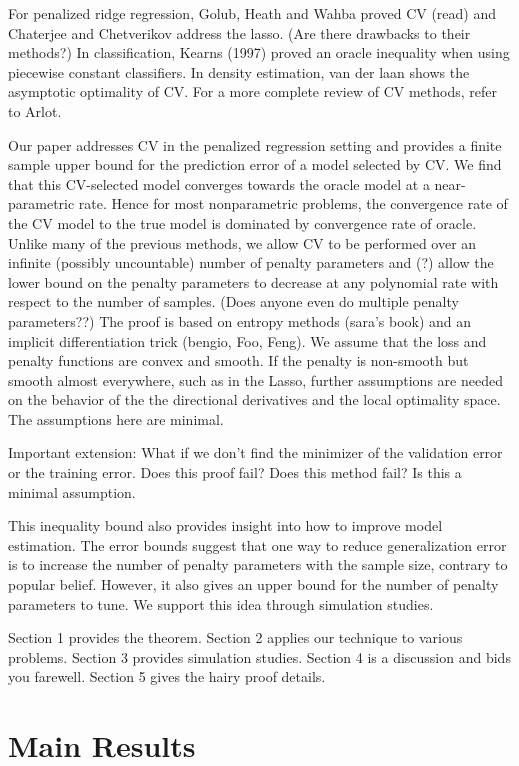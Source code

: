 \documentclass[12pt]{article}
\begin{document}
For penalized ridge regression, Golub, Heath and Wahba proved CV (read) and Chaterjee and Chetverikov address the lasso. (Are there drawbacks to their methods?) In classification, Kearns (1997) proved an oracle inequality when using piecewise constant classifiers. In density estimation, van der laan shows the asymptotic optimality of CV. For a more complete review of CV methods, refer to Arlot.

Our paper addresses CV in the penalized regression setting and provides a finite sample upper bound for the prediction error of a model selected by CV. We find that this CV-selected model converges towards the oracle model at a near-parametric rate. Hence for most nonparametric problems, the convergence rate of the CV model to the true model is dominated by convergence rate of oracle. Unlike many of the previous methods, we allow CV to be performed over an infinite (possibly uncountable) number of penalty parameters and (?) allow the lower bound on the penalty parameters to decrease at any polynomial rate with respect to the number of samples. (Does anyone even do multiple penalty parameters??) The proof is based on entropy methods (sara's book) and an implicit differentiation trick (bengio, Foo, Feng). We assume that the loss and penalty functions are convex and smooth. If the penalty is non-smooth but smooth almost everywhere, such as in the Lasso, further assumptions are needed on the behavior of the the directional derivatives and the local optimality space. The assumptions here are minimal.

Important extension: What if we don't find the minimizer of the validation error or the training error. Does this proof fail? Does this method fail? Is this a minimal assumption.

This inequality bound also provides insight into how to improve model estimation. The error bounds suggest that one way to reduce generalization error is to increase the number of penalty parameters with the sample size, contrary to popular belief. However, it also gives an upper bound for the number of penalty parameters to tune. We support this idea through simulation studies.

Section 1 provides the theorem. Section 2 applies our technique to various problems. Section 3 provides simulation studies. Section 4 is a discussion and bids you farewell. Section 5 gives the hairy proof details.

\section{Main Results}
\end{document}
